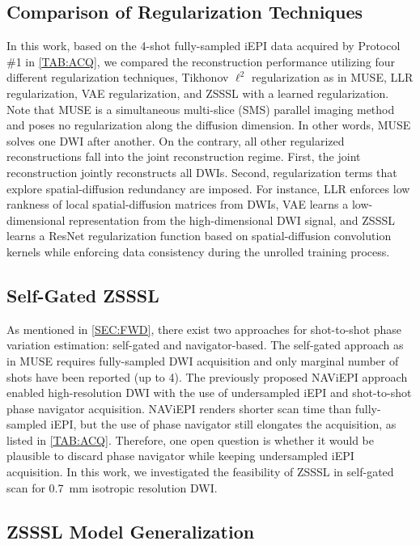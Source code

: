 \documentclass[journal,twoside,web]{ieeecolor}
\begin{document}
	\subsection{Comparison of Regularization Techniques}

	In this work, based on the 4-shot fully-sampled iEPI data
	acquired by Protocol \#1 in \cref{TAB:ACQ},
	we compared the reconstruction performance
	utilizing four different regularization techniques,
	Tikhonov $\ell^2$ regularization as in MUSE,
	LLR regularization,
	VAE regularization,
	and ZSSSL with a learned regularization.
	Note that MUSE is a simultaneous multi-slice (SMS) parallel imaging method
	and poses no regularization along the diffusion dimension.
	In other words, MUSE solves one DWI after another.
	On the contrary, all other regularized reconstructions
	fall into the joint reconstruction regime.
	First, the joint reconstruction jointly reconstructs all DWIs.
	Second, regularization terms that explore spatial-diffusion redundancy are imposed.
	For instance, LLR enforces low rankness of local spatial-diffusion matrices from DWIs,
	VAE learns a low-dimensional representation from the high-dimensional DWI signal,
	and ZSSSL learns a ResNet regularization function
	based on spatial-diffusion convolution kernels
	while enforcing data consistency during the unrolled training process.

	\subsection{Self-Gated ZSSSL}

	As mentioned in \cref{SEC:FWD}, there exist two approaches for
	shot-to-shot phase variation estimation: self-gated and navigator-based.
	The self-gated approach as in MUSE \cite{chen_2013_muse}
	requires fully-sampled DWI acquisition and
	only marginal number of shots have been reported (up to 4).
	The previously proposed NAViEPI approach enabled high-resolution DWI
	with the use of undersampled iEPI and shot-to-shot phase navigator acquisition.
	NAViEPI renders shorter scan time than fully-sampled iEPI,
	but the use of phase navigator still elongates the acquisition,
	as listed in \cref{TAB:ACQ}.
	Therefore, one open question is whether it would be plausible to
	discard phase navigator while keeping undersampled iEPI acquisition.
	In this work, we investigated the feasibility of ZSSSL in self-gated scan
	for \SI{0.7}{\milli\meter} isotropic resolution DWI.

	\subsection{ZSSSL Model Generalization} \label{SEC:ZSSSL_GEN}
\end{document}
